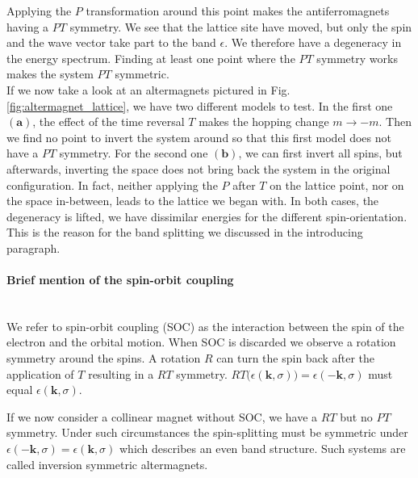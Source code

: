 \documentclass[../main.tex]{main.tex}
\begin{document}
Applying the $P$ transformation around this point makes the antiferromagnets having a $PT$ symmetry. We see that the lattice site have moved, but only the spin and
the wave vector take part to the band $\epsilon$. We therefore have a degeneracy in the energy spectrum. Finding at least one point where the $PT$ 
symmetry works makes the system $PT$ symmetric.\\

If we now take a look at an altermagnets pictured in Fig. \ref{fig:altermagnet_lattice}, we have two different models to test. In the first one $\bm{(a)}$,
the effect of the time reversal $T$ makes the hopping change $m\rightarrow -m$. Then we find no point
to invert the system around so that this first model does not have a $PT$ symmetry. For the second one $\bm{(b)}$,
we can first invert all spins, but afterwards, inverting the space does not bring back the system in the original configuration.
In fact, neither applying the $P$ after $T$ on the lattice point, nor on the space in-between, leads to the lattice we began with. In both cases, the 
degeneracy is lifted, we have dissimilar energies for the different spin-orientation. This is the reason for the band splitting we discussed in the introducing 
paragraph.\newpage

\paragraph{Brief mention of the spin-orbit coupling} $~$ \\

We refer to spin-orbit coupling (SOC) as the interaction between the spin of the electron and the orbital motion. 
When SOC is discarded we observe a rotation symmetry around the spins. A rotation $R$ can turn the spin back after the application of $T$
resulting in a $RT$ symmetry. $RT\bigl(\epsilon(\bm{k},\sigma)\bigr) = \epsilon(-\bm{k},\sigma)$ must equal $\epsilon(\bm{k},\sigma)$.

If we now consider a collinear magnet without SOC, we have a $RT$ but no $PT$ symmetry. Under such circumstances the spin-splitting must be symmetric under 
$\epsilon(-\bm{k},\sigma) = \epsilon(\bm{k},\sigma)$ which describes an even band structure. Such systems are called inversion symmetric altermagnets.\\
\end{document}
